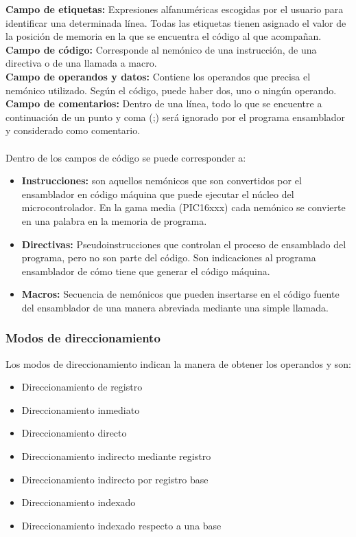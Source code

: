 \documentclass[12pt,a4paper]{article}
\begin{document}
   \textbf{Campo de etiquetas: }Expresiones alfanuméricas escogidas por el usuario para identificar una determinada línea. Todas las etiquetas tienen asignado el valor de la posición de memoria en la que se encuentra el código al que acompañan.\\
   \textbf{Campo de código: }Corresponde al nemónico de una instrucción, de una directiva o de una llamada a macro.\\
   \textbf{Campo de operandos y datos: }Contiene los operandos que precisa el nemónico utilizado. Según el código, puede haber dos, uno o ningún operando.\\
   \textbf{Campo de comentarios: }Dentro de una línea, todo lo que se encuentre a continuación de un punto y coma (;) será ignorado por el programa ensamblador y considerado como comentario.\\
   \\
   Dentro de los campos de código se puede corresponder a:
   \begin{itemize}
   		\item \textbf{Instrucciones: }son aquellos nemónicos que son convertidos por el ensamblador en código máquina que puede ejecutar el núcleo del microcontrolador. En la gama media (PIC16xxx) cada nemónico se convierte en una palabra en la memoria de programa.
   		\item \textbf{Directivas: }Pseudoinstrucciones que controlan el proceso de ensamblado del programa, pero no son parte del código. Son indicaciones al programa ensamblador de cómo tiene que generar el código máquina.
   		\item \textbf{Macros: }Secuencia de nemónicos que pueden insertarse en el código fuente del ensamblador de una manera abreviada mediante una simple llamada.
   \end{itemize}
   
   \subsubsection{Modos de direccionamiento}
   Los modos de direccionamiento indican la manera de obtener los operandos y son:
   \begin{itemize}
   \item Direccionamiento de registro
   \item Direccionamiento inmediato
   \item Direccionamiento directo
   \item Direccionamiento indirecto mediante registro
   \item Direccionamiento indirecto por registro base 
   \item Direccionamiento indexado
   \item Direccionamiento indexado respecto a una base

   \end{itemize}
   
\end{document}

